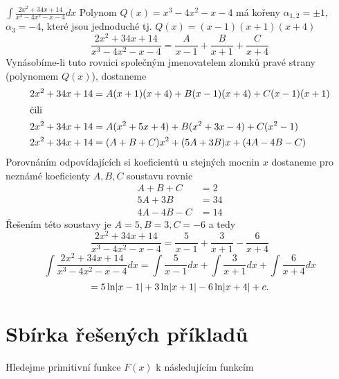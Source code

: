       \begin{example}
        $\displaystyle\int{\frac{2x^2+34x+14}{x^3-4x^2-x-4}}dx$ \cite[s.~90]{Knichal}\newline
        Polynom $Q(x)=x^3-4x^2-x-4$ má kořeny $\alpha_{1,2}=\pm1$, $\alpha_{3}=-4$, které jsou
        jednoduché tj. $Q(x)=(x-1)(x+1)(x+4)$ $$\frac{2x^2+34x+14}{x^3-4x^2-x-4} =
        \frac{A}{x-1}+\frac{B}{x+1}+\frac{C}{x+4}$$ Vynásobíme-li tuto rovnici společným
        jmenovatelem zlomků pravé strany (polynomem $Q(x)$), dostaneme
        \footnotesize\begin{align*}
          2x^2+34x+14 &= A(x+1)(x+4)+B(x-1)(x+4)+C(x-1)(x+1) \\
          \shortintertext{čili}
          2x^2+34x+14 &= A(x^2+5x+4)+B(x^2+3x-4)+C(x^2-1) \\
          2x^2+34x+14 &= (A+B+C)x^2+(5A+3B)x + (4A-4B-C)
        \end{align*}\small
        Porovnáním odpovídajících si koeficientů u stejných mocnin $x$  dostaneme pro nez\-ná\-mé
        koeficienty $A, B, C$ soustavu rovnic
        \begin{align*}
           A+   B + C &= 2 \\
          5A + 3B     &= 34 \\
          4A - 4B - C &= 14
        \end{align*}
        Řešením této soustavy je $A = 5, B = 3, C = -6$ a tedy
        $$\frac{2x^2+34x+14}{x^3-4x^2-x-4} = \frac{5}{x-1}+\frac{3}{x+1}-\frac{6}{x+4}$$
        \begin{equation*}
          \int{\frac{2x^2+34x+14}{x^3-4x^2-x-4}}dx 
            = \int{\frac{5}{x-1}}dx + \int{\frac{3}{x+1}}dx + \int{\frac{6}{x+4}}dx            
        \end{equation*}
        \begin{equation*}
            = 5\ln\abs{x-1} +  3\ln\abs{x+1} - 6\ln\abs{x+4} +c.
        \end{equation*}
      \end{example}

  \section{Sbírka řešených příkladů}
    Hledejme primitivní funkce \(F(x)\) k následujícím funkcím
    
